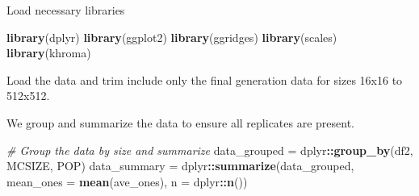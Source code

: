 \documentclass[
]{book}
\newenvironment{Shaded}{\begin{snugshade}}{\end{snugshade}}
\newcommand{\CommentTok}[1]{\textcolor[rgb]{0.56,0.35,0.01}{\textit{#1}}}
\newcommand{\DataTypeTok}[1]{\textcolor[rgb]{0.13,0.29,0.53}{#1}}
\newcommand{\DecValTok}[1]{\textcolor[rgb]{0.00,0.00,0.81}{#1}}
\newcommand{\KeywordTok}[1]{\textcolor[rgb]{0.13,0.29,0.53}{\textbf{#1}}}
\newcommand{\NormalTok}[1]{#1}
\newcommand{\OperatorTok}[1]{\textcolor[rgb]{0.81,0.36,0.00}{\textbf{#1}}}
\newcommand{\StringTok}[1]{\textcolor[rgb]{0.31,0.60,0.02}{#1}}
\begin{document}
Load necessary libraries

\begin{Shaded}
\begin{Highlighting}[]
\KeywordTok{library}\NormalTok{(dplyr)}
\KeywordTok{library}\NormalTok{(ggplot2)}
\KeywordTok{library}\NormalTok{(ggridges)}
\KeywordTok{library}\NormalTok{(scales)}
\KeywordTok{library}\NormalTok{(khroma)}
\end{Highlighting}
\end{Shaded}

Load the data and trim include only the final generation data for sizes 16x16 to 512x512.

\begin{Shaded}
\end{Shaded}

We group and summarize the data to ensure all replicates are present.

\begin{Shaded}
\begin{Highlighting}[]
\CommentTok{\# Group the data by size and summarize}
\NormalTok{data\_grouped =}\StringTok{ }\NormalTok{dplyr}\OperatorTok{::}\KeywordTok{group\_by}\NormalTok{(df2, MCSIZE, POP)}
\NormalTok{data\_summary =}\StringTok{ }\NormalTok{dplyr}\OperatorTok{::}\KeywordTok{summarize}\NormalTok{(data\_grouped, }\DataTypeTok{mean\_ones =} \KeywordTok{mean}\NormalTok{(ave\_ones), }\DataTypeTok{n =}\NormalTok{ dplyr}\OperatorTok{::}\KeywordTok{n}\NormalTok{())}
\end{Highlighting}
\end{Shaded}
\end{document}
